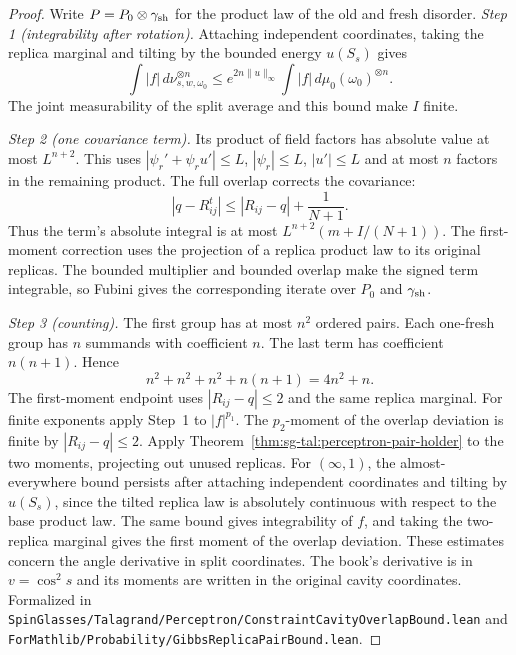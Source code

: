 \begin{proof}
  \leanok
Write $P=P_0\otimes\gamma_{\rm sh}$ for the product law of the old and fresh disorder.
\emph{Step 1 (integrability after rotation).} Attaching independent coordinates, taking
the replica marginal and tilting by the bounded energy $u(S_s)$ gives
\[
 \int |f|\,d\nu_{s,w,\omega_0}^{\otimes n}
 \le e^{2n\|u\|_\infty}\int |f|\,d\mu_0(\omega_0)^{\otimes n}.
\]
The joint measurability of the split average and this bound make $I$ finite.

\emph{Step 2 (one covariance term).} Its product of field factors has absolute value at
most $L^{n+2}$. This uses $|\psi_r'+\psi_r u'|\le L$, $|\psi_r|\le L$, $|u'|\le L$
and at most $n$ factors in the remaining product. The full overlap corrects the covariance:
\[
 |q-R^t_{ij}|\le |R_{ij}-q|+\frac{1}{N+1}.
\]
Thus the term's absolute integral is at most $L^{n+2}(m+I/(N+1))$.
The first-moment correction uses the projection of a replica product law to its original
replicas. The bounded multiplier and bounded overlap make the signed term integrable,
so Fubini gives the corresponding iterate over $P_0$ and $\gamma_{\rm sh}$.

\emph{Step 3 (counting).} The first group has at most $n^2$ ordered pairs. Each one-fresh
group has $n$ summands with coefficient $n$. The last term has coefficient $n(n+1)$. Hence
\[
 n^2+n^2+n^2+n(n+1)=4n^2+n.
\]
The first-moment endpoint uses $|R_{ij}-q|\le2$ and the same replica marginal.
For finite exponents apply Step~1 to $|f|^{p_1}$. The $p_2$-moment of the overlap
deviation is finite by $|R_{ij}-q|\le2$. Apply
Theorem~\ref{thm:sg-tal:perceptron-pair-holder} to the two moments, projecting out unused replicas.
For $(\infty,1)$, the almost-everywhere bound persists after attaching independent
coordinates and tilting by $u(S_s)$, since the tilted replica law is absolutely continuous
with respect to the base product law. The same bound gives integrability of $f$, and
taking the two-replica marginal gives the first moment of the overlap deviation.
These estimates concern the angle derivative in split coordinates. The book's derivative is in $v=\cos^2s$ and its
moments are written in the original cavity coordinates.
Formalized in \texttt{SpinGlasses/Talagrand/Perceptron/ConstraintCavityOverlapBound.lean}
and \texttt{ForMathlib/Probability/GibbsReplicaPairBound.lean}.
\end{proof}

